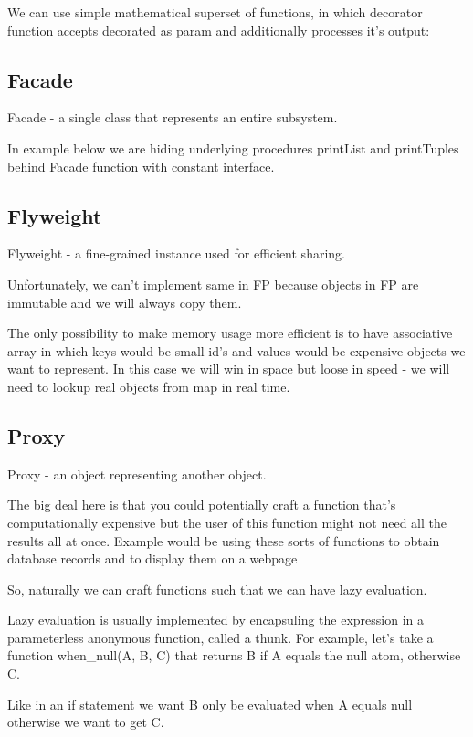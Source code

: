 We can use simple mathematical superset of functions, in which decorator function accepts decorated as param and additionally processes it's output:

\subsection{Facade} \label{subsection:pattern11}
    Facade - a single class that represents an entire subsystem.

In example below we are hiding underlying procedures printList and printTuples behind Facade function with constant interface.

\subsection{Flyweight} \label{subsection:pattern12}
    Flyweight - a fine-grained instance used for efficient sharing.

Unfortunately, we can't implement same in FP because objects in FP are immutable and we will always copy them.

The only possibility to make memory usage more efficient is to have associative array in which keys would be small id's and values would be expensive objects we want to represent. In this case we will win in space but loose in speed - we will need to lookup real objects from map in real time.

\subsection{Proxy} \label{subsection:pattern14}
    Proxy - an object representing another object.

The big deal here is that you could potentially craft a function that's computationally expensive but the user of this function might not need all the results all at once. Example would be using these sorts of functions to obtain database records and to display them on a webpage

So, naturally we can craft functions such that we can have lazy evaluation. 

Lazy evaluation is usually implemented by encapsuling the expression in a parameterless anonymous function, called a thunk. For example, let's take a function when\_null(A, B, C) that returns B if A equals the null atom, otherwise C. 

Like in an if statement we want B only be evaluated when A equals null otherwise we want to get C.


